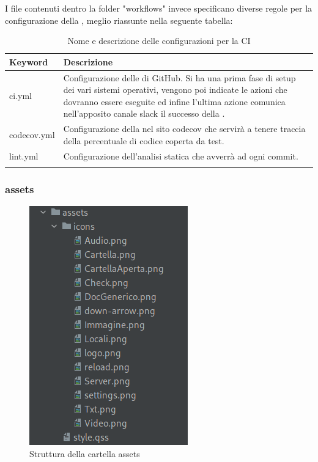 I file contenuti dentro la folder "workflows" invece specificano diverse regole per la configurazione della , meglio riassunte nella seguente tabella:
{
	\setlength{\freewidth}{\dimexpr\textwidth-1\tabcolsep}
	\renewcommand{\arraystretch}{1.5}
	\setlength{\aboverulesep}{0pt}
	\setlength{\belowrulesep}{0pt}
	\begin{longtable}{L{.15\freewidth} L{.85\freewidth}}
		\textbf{Keyword} & \textbf{Descrizione}\\
		\toprule
		\endhead	
		ci.yml & Configurazione delle  di GitHub. Si ha una prima fase di setup dei vari sistemi operativi, vengono poi indicate le azioni che dovranno essere eseguite ed infine l'ultima azione comunica nell'apposito canale slack il successo della .\\
		codecov.yml & Configurazione della  nel sito codecov che servirà a tenere traccia della percentuale di codice coperta da test.\\
		lint.yml & Configurazione dell'analisi statica che avverrà ad ogni commit. \\
		\bottomrule
		\hiderowcolors
		\caption{Nome e descrizione delle configurazioni per la CI}
	\end{longtable}
}
\subsubsection{assets}    
\begin{figure}[H]
    \centering
    \includegraphics[scale = 0.5]{components/img/struttura-cartella-assets.png}
    \caption{Struttura della cartella assets}
    \label{fig:Struttura della cartella assets}
\end{figure}   
